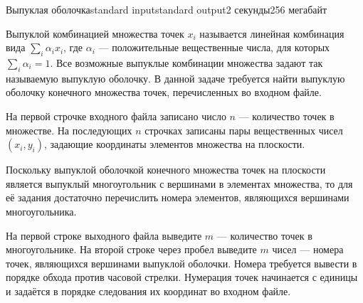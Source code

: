 \begin{problem}{Выпуклая оболочка}{standard input}{standard output}{2 секунды}{256 мегабайт}

Выпуклой комбинацией множества точек $x_i$ называется линейная комбинация вида $\sum_i \alpha_i x_i$, где $\alpha_i$ — положительные вещественные числа, для которых $\sum_i \alpha_i = 1$. Все возможные выпуклые комбинации множества задают так называемую выпуклую оболочку. В данной задаче требуется найти выпуклую оболочку конечного множества точек, перечисленных во входном файле.

\InputFile

На первой строчке входного файла записано число $n$ — количество точек в множестве. На последующих $n$ строчках записаны пары вещественных чисел $(x_i, y_i)$, задающие координаты элементов множества на плоскости.

\OutputFile

Поскольку выпуклой оболочкой конечного множества точек на плоскости является выпуклый многоугольник с вершинами в элементах множества, то для её задания достаточно перечислить номера элементов, являющихся вершинами многоугольника.

На первой строке выходного файла выведите $m$ — количество точек в многоугольнике. На второй строке через пробел выведите $m$ чисел — номера точек, являющихся вершинами выпуклой оболочки. Номера требуется вывести в порядке обхода против часовой стрелки. Нумерация точек начинается с единицы и задаётся в порядке следования их координат во входном файле.

\Examples

\begin{example}%
%
\end{example}

\end{problem}
